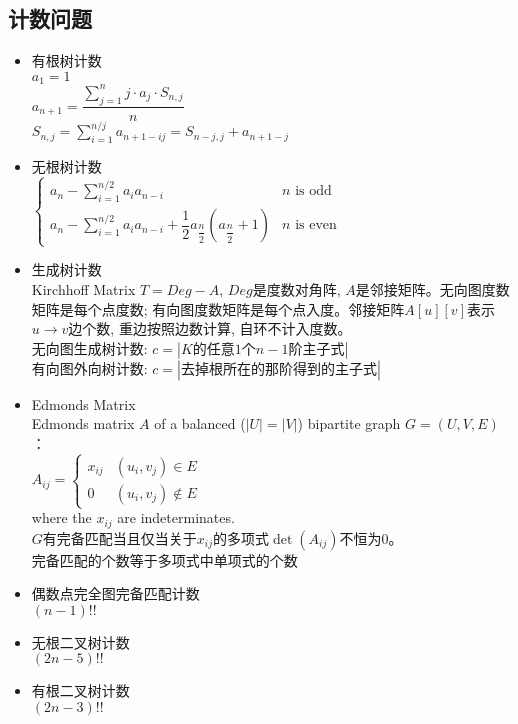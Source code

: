 \subsection*{计数问题}
    \begin{itemize}[wide=0pt]
        \item 有根树计数
            \\$ a_1 = 1 $
            \\$ a_{n + 1} = \dfrac{\sum\limits_{j = 1}^{n} j \cdot a_j \cdot S_{n, j}}{n} $
            \\$ S_{n, j} = \sum\limits_{i = 1}^{n / j} a_{n + 1 - ij} = S_{n - j, j} + a_{n + 1 - j} $
        \item 无根树计数
            \\$ \begin{cases}
                a_n - \sum\limits_{i = 1}^{n / 2} a_i a_{n - i} & n \text{ is odd}\\
                a_n - \sum\limits_{i = 1}^{n / 2} a_i a_{n - i} + \dfrac{1}{2} a_{\dfrac{n}{2}} (a_{\dfrac{n}{2}} + 1) & n \text{ is even}
            \end{cases} $
        \item 生成树计数
            \\Kirchhoff Matrix $ T = Deg − A $, $ Deg $是度数对角阵, $ A $是邻接矩阵。无向图度数矩阵是每个点度数; 有向图度数矩阵是每个点入度。邻接矩阵$ A[u][v] $表示$ u \to v $边个数, 重边按照边数计算, 自环不计入度数。
            \\无向图生成树计数: $ c = \left|K\text{的任意}1\text{个}n−1\text{阶主子式}\right| $
            \\有向图外向树计数: $ c = \left|\text{去掉根所在的那阶得到的主子式}\right| $
        \item Edmonds Matrix
            \\Edmonds matrix $ A $ of a balanced ($ \left| U \right| = \left| V \right| $) bipartite graph $ G = (U, V, E) $：
            \\$ A_{ij} = \begin{cases}
                x_{ij} & (u_i, v_j) \in E\\
                0 & (u_i, v_j) \notin E
            \end{cases} $
            \\where the $ x_{ij} $ are indeterminates.
            \\$ G $有完备匹配当且仅当关于$ x_{ij} $的多项式$ \det(A_{ij}) $不恒为$ 0 $。
            \\完备匹配的个数等于多项式中单项式的个数
        \item 偶数点完全图完备匹配计数
            \\$ (n - 1)!! $
        \item 无根二叉树计数
            \\$ (2n - 5)!! $
        \item 有根二叉树计数
            \\$ (2n - 3)!! $
    \end{itemize}

